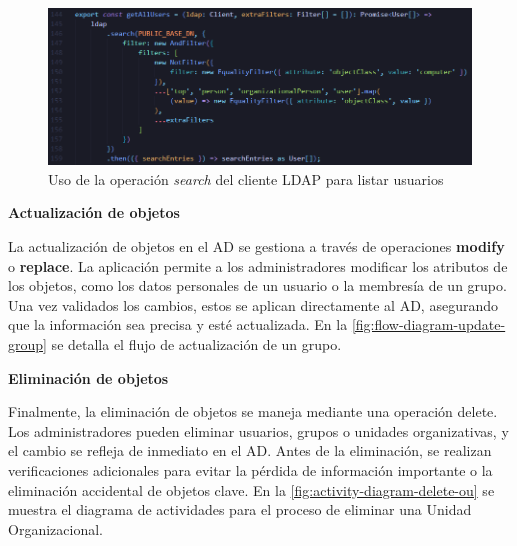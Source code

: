 \begin{figure}[H]
    \centering
    \includegraphics[width=\linewidth]{images/code/getAllUsers.png}
    \caption{Uso de la operación \textit{search} del cliente LDAP para listar usuarios}
    \label{fig:get-all-users}
\end{figure}

\textbf{Actualización de objetos}

La actualización de objetos en el AD se gestiona a través de operaciones \textbf{modify} o \textbf{replace}. La aplicación permite a los administradores modificar los atributos de los objetos, como los datos personales de un usuario o la membresía de un grupo. Una vez validados los cambios, estos se aplican directamente al AD, asegurando que la información sea precisa y esté actualizada. En la \autoref{fig:flow-diagram-update-group} se detalla el flujo de actualización de un grupo.

\textbf{Eliminación de objetos}

Finalmente, la eliminación de objetos se maneja mediante una operación delete. Los administradores pueden eliminar usuarios, grupos o unidades organizativas, y el cambio se refleja de inmediato en el AD. Antes de la eliminación, se realizan verificaciones adicionales para evitar la pérdida de información importante o la eliminación accidental de objetos clave. En la \autoref{fig:activity-diagram-delete-ou} se muestra el diagrama de actividades para el proceso de eliminar una Unidad Organizacional.
